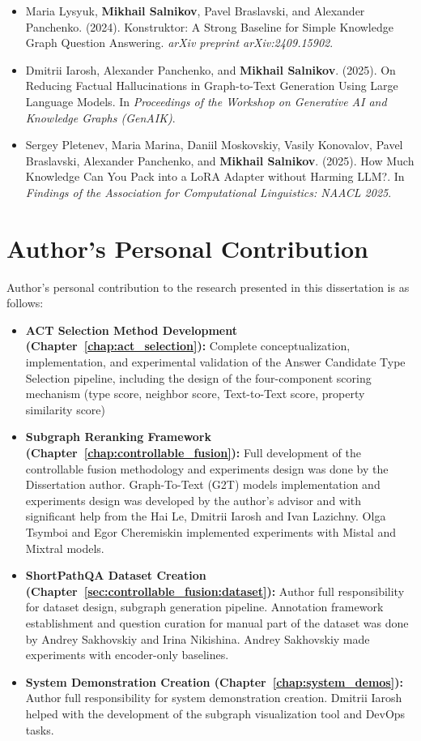 \begin{itemize}
    \item Maria Lysyuk, \textbf{Mikhail Salnikov}, Pavel Braslavski, and Alexander Panchenko. (2024). Konstruktor: A Strong Baseline for Simple Knowledge Graph Question Answering. \textit{arXiv preprint arXiv:2409.15902}.
    \item Dmitrii Iarosh, Alexander Panchenko, and \textbf{Mikhail Salnikov}. (2025). On Reducing Factual Hallucinations in Graph-to-Text Generation Using Large Language Models. In \textit{Proceedings of the Workshop on Generative AI and Knowledge Graphs (GenAIK)}.
    \item Sergey Pletenev, Maria Marina, Daniil Moskovskiy, Vasily Konovalov, Pavel Braslavski, Alexander Panchenko, and \textbf{Mikhail Salnikov}. (2025). How Much Knowledge Can You Pack into a LoRA Adapter without Harming LLM?. In \textit{Findings of the Association for Computational Linguistics: NAACL 2025}.
\end{itemize}

\section{Author's Personal Contribution}
\label{sec:intro:contribution}

Author's personal contribution to the research presented in this dissertation is as follows:
\begin{itemize}
    \item \textbf{ACT Selection Method Development (Chapter~\ref{chap:act_selection}):} Complete conceptualization, implementation, and experimental validation of the Answer Candidate Type Selection pipeline, including the design of the four-component scoring mechanism (type score, neighbor score, Text-to-Text score, property similarity score)
    \item \textbf{Subgraph Reranking Framework (Chapter~\ref{chap:controllable_fusion}):} Full development of the controllable fusion methodology and experiments design was done by the Dissertation author. Graph-To-Text (G2T) models implementation and experiments design was developed by the author's advisor and with significant help from the Hai Le, Dmitrii Iarosh and Ivan Lazichny. Olga Tsymboi and Egor Cheremiskin implemented experiments with Mistal and Mixtral models. 
    \item \textbf{ShortPathQA Dataset Creation (Chapter~\ref{sec:controllable_fusion:dataset}):} Author full responsibility for dataset design, subgraph generation pipeline. Annotation framework establishment and question curation for manual part of the dataset was done by Andrey Sakhovskiy and Irina Nikishina. Andrey Sakhovskiy made experiments with encoder-only baselines.
    \item \textbf{System Demonstration Creation (Chapter~\ref{chap:system_demos}):} Author full responsibility for system demonstration creation. Dmitrii Iarosh helped with the development of the subgraph visualization tool and DevOps tasks.
\end{itemize}

